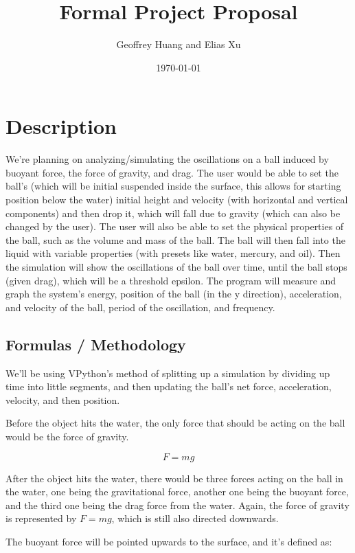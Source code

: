 \documentclass{article}
\begin{document}
\title{Formal Project Proposal}
\author{Geoffrey Huang and Elias Xu}
\date{\today}
\maketitle
\setlength{\parindent}{0pt}

\section{Description}

We’re planning on analyzing/simulating the oscillations on a ball induced by buoyant force, the force of gravity, and drag. The user would be able to set the ball's (which will be initial suspended inside the surface, this allows for starting position below the water) initial height and velocity (with horizontal and vertical components) and then drop it, which will fall due to gravity (which can also be changed by the user). The user will also be able to set the physical properties of the ball, such as the volume and mass of the ball. The ball will then fall into the liquid with variable properties (with presets like water, mercury, and oil). Then the simulation will show the oscillations of the ball over time, until the ball stops (given drag), which will be a threshold epsilon. The program will measure and graph the system's energy, position of the ball (in the y direction), acceleration, and velocity of the ball, period of the oscillation, and frequency.


\subsection{Formulas / Methodology}

We'll be using VPython's method of splitting up a simulation by dividing up time into little segments, and then updating the ball's net force, acceleration, velocity, and then position.

Before the object hits the water, the only force that should be acting on the ball would be the force of gravity.

$$F = mg$$

After the object hits the water, there would be three forces acting on the ball in the water, one being the gravitational force, another one being the buoyant force, and the third one being the drag force from the water. Again, the force of gravity is represented by $F = mg$, which is still also directed downwards.

The buoyant force will be pointed upwards to the surface, and it's defined as:
\end{document}
